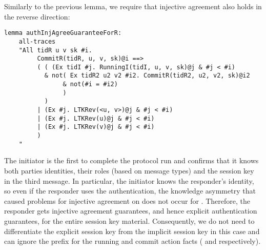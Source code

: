 {Similarly to the previous lemma, we require that injective agreement also holds
in the reverse direction:
%

\begin{lstlisting}
lemma authInjAgreeGuaranteeForR:
    all-traces
    "All tidR u v sk #i.
         CommitR(tidR, u, v, sk)@i ==>
         ( ( (Ex tidI #j. RunningI(tidI, u, v, sk)@j & #j < #i)
           & not( Ex tidR2 u2 v2 #i2. CommitR(tidR2, u2, v2, sk)@i2
                & not(#i = #i2)
                )
           )
         | (Ex #j. LTKRev(<u, v>)@j & #j < #i)
         | (Ex #j. LTKRev(u)@j & #j < #i)
         | (Ex #j. LTKRev(v)@j & #j < #i)
         )
    "
\end{lstlisting}
%
The initiator is the first to complete the protocol run and confirms that
it knows both parties identities, their roles (based on message types) and the
session key in the third message.
%
In particular, the initiator knows the responder's identity, so even if the
responder uses the \mStat{} authentication, the knowledge asymmetry that caused
problems for injective agreement on \mGiy{} does not occur for \mGrx{}.
%
Therefore, the responder gets injective agreement guarantees, and hence explicit
authentication guarantees, for the entire session key material.
%
Consequently, we do not need to differentiate the explicit session key from the
implicit session key in this case and can ignore the  prefix for the
running and commit action facts ( and  respectively).
%
\\

}
